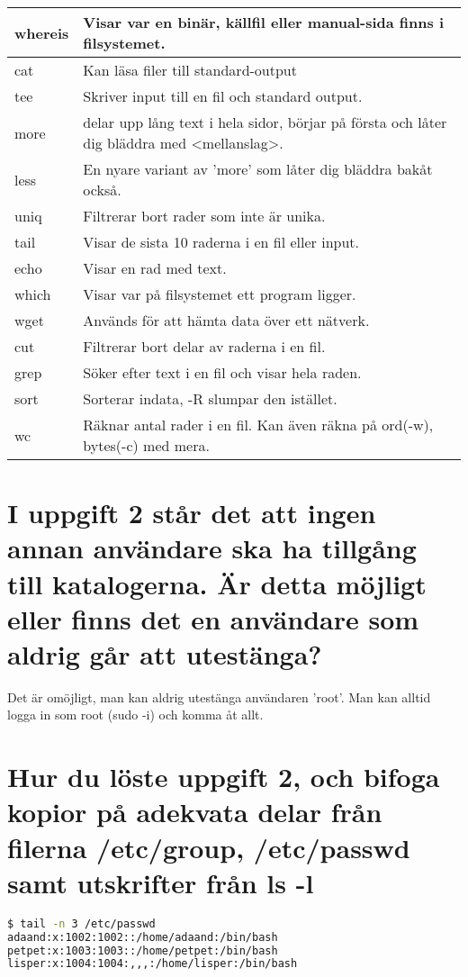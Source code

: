 \documentclass[11pt]{article}
\begin{document}
\begin{center}
\begin{longtable}{ | l | p{10cm} |}
	whereis & Visar var en binär, källfil eller manual-sida finns i filsystemet. \\ \hline	
	cat & Kan läsa filer till standard-output \\ \hline	
	tee & Skriver input till en fil och standard output. \\ \hline	
	more & delar upp lång text i hela sidor, börjar på första och låter dig bläddra med <mellanslag>. \\ \hline	
	less & En nyare variant av 'more' som låter dig bläddra bakåt också.\\ \hline	
	uniq & Filtrerar bort rader som inte är unika. \\ \hline	
	tail & Visar de sista 10 raderna i en fil eller input. \\ \hline	
	echo & Visar en rad med text. \\ \hline	
	which & Visar var på filsystemet ett program ligger. \\ \hline	
	wget & Används för att hämta data över ett nätverk.  \\ \hline	
	cut & Filtrerar bort delar av raderna i en fil.  \\ \hline	
	grep & Söker efter text i en fil och visar hela raden. \\ \hline	
	sort & Sorterar indata, -R slumpar den istället. \\ \hline	
	wc & Räknar antal rader i en fil. Kan även räkna på ord(-w), bytes(-c) med mera.  \\ \hline	    
    \end{longtable}
\end{center}

\section{I uppgift 2 står det att ingen annan användare ska ha tillgång till katalogerna. Är detta möjligt eller finns det en användare som aldrig går att utestänga?}
Det är omöjligt, man kan aldrig utestänga användaren 'root'. Man kan alltid logga in som root (sudo -i) och komma åt allt. 

\section{Hur du löste uppgift 2, och bifoga kopior på adekvata delar från filerna /etc/group, /etc/passwd samt utskrifter från ls -l}

\begin{lstlisting}[language=bash,caption={Utdrag från /etc/passwd}]
$ tail -n 3 /etc/passwd
adaand:x:1002:1002::/home/adaand:/bin/bash
petpet:x:1003:1003::/home/petpet:/bin/bash
lisper:x:1004:1004:,,,:/home/lisper:/bin/bash
\end{lstlisting}
\end{document}
